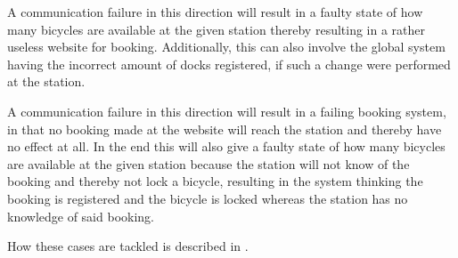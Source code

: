 \begin{description}[style=nextline]
\item[Station to Global System]
A communication failure in this direction will result in a faulty state of how many bicycles are available at the given station thereby resulting in a rather useless website for booking.
Additionally, this can also involve the global system having the incorrect amount of docks registered, if such a change were performed at the station.
\item[Global System to Station]
A communication failure in this direction will result in a failing booking system, in that no booking made at the website will reach the station and thereby have no effect at all.
In the end this will also give a faulty state of how many bicycles are available at the given station because the station will not know of the booking and thereby not lock a bicycle, resulting in the system thinking the booking is registered and the bicycle is locked whereas the station has no knowledge of said booking.
\end{description}


How these cases are tackled is described in .
